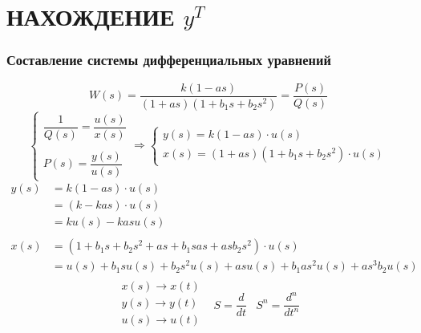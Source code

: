 \part{НАХОЖДЕНИЕ $y^T$}
    \section{Составление системы дифференциальных уравнений}
        $$
            W(s) = \frac{k(1-as)}{(1+as)(1+b_1s+b_2s^2)} = \frac{P(s)}{Q(s)}
        $$
        \vspace{1cm}
        $$
            \begin{cases}
                \dfrac{1}{Q(s)} = \dfrac{u(s)}{x(s)}
                \\\\ %
                P(s) = \dfrac{y(s)}{u(s)}
            \end{cases}
            \Rightarrow
            \begin{cases}
                y(s) = k(1-as) \cdot u(s)
                \\
                x(s) = (1+as)(1+b_1s+b_2s^2) \cdot u(s)
            \end{cases}
        $$
        \vspace{1cm}
        $$
            \begin{aligned}
                y(s)
                &= k(1-as) \cdot u(s) \\
                &= (k-kas) \cdot u(s) \\
                &= ku(s) - kasu(s)
                \\\\
                x(s)
                &= (1+b_1s + b_2s^2 + as + b_1sas + asb_2s^2) \cdot u(s) \\
                &= u(s) + b_1su(s) + b_2s^2u(s) + asu(s) + b_1as^2u(s) + as^3b_2u(s)
            \end{aligned}
        $$
        \vspace{1cm}
        $$
            \begin{matrix}
                \begin{matrix}
                    x(s) \to x(t) \\
                    y(s) \to y(t) \\
                    u(s) \to u(t) \\
                \end{matrix}
                &
                S = \dfrac{d}{dt}
                &
                S^n = \dfrac{d^n}{dt^n}
            \end{matrix}
        $$
